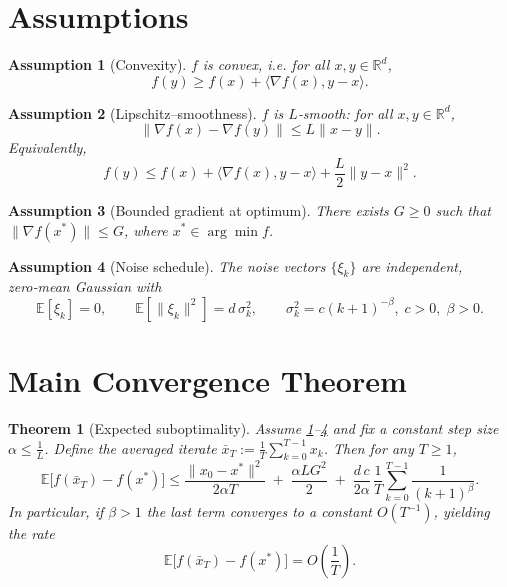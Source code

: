 \documentclass{article}
\newtheorem{theorem}{Theorem}
\newtheorem{assumption}{Assumption}
\newcommand{\E}{\mathbb{E}}
\newcommand{\R}{\mathbb{R}}
\begin{document}
\newpage
\section*{Assumptions}
\begin{assumption}[Convexity]\label{as:convex}
$f$ is convex, i.e. for all $x,y\in\R^{d}$,
\[
f(y)\ge f(x)+\langle \nabla f(x),y-x\rangle .
\]
\end{assumption}

\begin{assumption}[Lipschitz–smoothness]\label{as:smooth}
$f$ is $L$‑smooth: for all $x,y\in\R^{d}$,
\[
\|\nabla f(x)-\nabla f(y)\|\le L\|x-y\|.
\]
Equivalently,
\[
f(y)\le f(x)+\langle \nabla f(x),y-x\rangle+\frac{L}{2}\|y-x\|^{2}.
\]
\end{assumption}

\begin{assumption}[Bounded gradient at optimum]\label{as:gradbound}
There exists $G\ge0$ such that $\|\nabla f(x^{*})\|\le G$, where $x^{*}\in\arg\min f$.
\end{assumption}

\begin{assumption}[Noise schedule]\label{as:noise}
The noise vectors $\{\xi_{k}\}$ are independent, zero‑mean Gaussian with
\[
\E[\xi_{k}]=0,\qquad \E[\|\xi_{k}\|^{2}]=d\,\sigma_{k}^{2},\qquad 
\sigma_{k}^{2}=c(k+1)^{-\beta},\;c>0,\;\beta>0 .
\]
\end{assumption}

\section*{Main Convergence Theorem}
\begin{theorem}[Expected suboptimality]\label{thm:main}
Assume \ref{as:convex}–\ref{as:noise} and fix a constant step size $\alpha\le \frac{1}{L}$.  
Define the averaged iterate $\bar x_{T}:=\frac{1}{T}\sum_{k=0}^{T-1}x_{k}$.  
Then for any $T\ge1$,
\[
\E\!\bigl[f(\bar x_{T})-f(x^{*})\bigr]
\le
\frac{\|x_{0}-x^{*}\|^{2}}{2\alpha T}
\;+\;
\frac{\alpha L G^{2}}{2}
\;+\;
\frac{d\,c}{2\alpha}\,\frac{1}{T}\sum_{k=0}^{T-1}\frac{1}{(k+1)^{\beta}} .
\tag{3}
\]
In particular, if $\beta>1$ the last term converges to a constant $O(T^{-1})$, yielding the rate  
\[
\E\!\bigl[f(\bar x_{T})-f(x^{*})\bigr]=O\!\left(\frac{1}{T}\right).
\]
\end{theorem}
\end{document}
